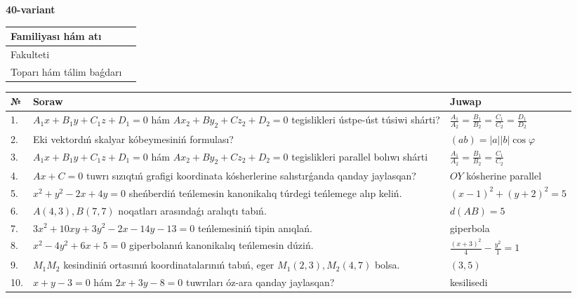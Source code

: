 \documentclass{article}
\begin{document}
\egroup

\newpage


\textbf{40-variant}\\

\bgroup
\def\arraystretch{1.6} %

\begin{tabular}{|m{5.7cm}|m{9.5cm}|}
\hline
Familiyası hám atı & \\
\hline
Fakulteti  & \\
\hline
Toparı hám tálim baǵdarı  & \\
\hline
\end{tabular}

\vspace{1cm}

\begin{tabular}{|m{0.7cm}|m{10cm}|m{4cm}|}
\hline
№ & Soraw & Juwap \\
\hline
1. & $A_1x+B_1y+C_1z+D_1=0$ hám $Ax_2+By_2+Cz_2+D_2=0$ tegislikleri ústpe-úst túsiwi shárti? & $\frac{A_1}{A_2}=\frac{B_1}{B_2}=\frac{C_1}{C_2}=\frac{D_1}{D_2}$ \\
\hline
2. & Eki vektordıń skalyar kóbeymesiniń formulası? & $(ab)=|a||b|\cos\varphi$ \\
\hline
3. & $A_1x+B_1y+C_1z+D_1=0$ hám $Ax_2+By_2+Cz_2+D_2=0$ tegislikleri parallel bolıwı shárti & $\frac{A_1}{A_2}=\frac{B_1}{B_2}=\frac{C_1}{C_2}$ \\
\hline
4. & $Ax+C=0$ tuwrı sızıqtıń grafigi koordinata kósherlerine salıstırǵanda qanday jaylasqan? & $OY$ kósherine parallel \\
\hline
5. & $x^{2}+y^{2}-2x+4y=0$ sheńberdiń teńlemesin kanonikalıq túrdegi teńlemege alıp keliń. & $(x-1)^{2}+(y+2)^{2}=5$ \\
\hline
6. & $A(4, 3), B(7, 7)$ noqatları arasındaǵı aralıqtı tabıń. & $d(AB)=5$ \\
\hline
7. & $3x^{2}+10xy+3y^{2}-2x-14y-13=0$ teńlemesiniń tipin anıqlań. & giperbola \\
\hline
8. & $x^{2}-4y^{2}+6x+5=0$ giperbolanıń kanonikalıq teńlemesin dúziń. & $\frac{(x+3)^{2}}{4}-\frac{y^{2}}{1}=1$ \\
\hline
9. & $M_{1}M_{2}$ kesindiniń ortasınıń koordinatalarınıń tabıń, eger $M_{1} (2, 3), M_{2} (4, 7)$ bolsa. & $(3,5)$ \\
\hline
10. & $x+y-3=0$ hám $2x+3y-8=0$ tuwrıları óz-ara qanday jaylasqan? & kesilisedi \\
\hline
\end{tabular}
\end{document}
